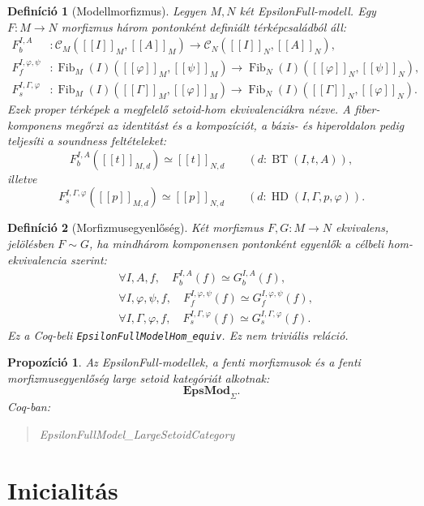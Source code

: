 \documentclass[11pt]{article}
\newtheorem{definition}{Definíció}
\newtheorem{proposition}{Propozíció}
\newenvironment{coqblock}
  {\begin{quote}\small\ttfamily\obeylines}
  {\end{quote}}
\newcommand{\EpsMod}{\mathbf{EpsMod}_{\Sigma}}
\newcommand{\BT}{\operatorname{BT}}
\newcommand{\HD}{\operatorname{HD}}
\newcommand{\Fib}{\operatorname{Fib}}
\newcommand{\sem}[1]{[\![#1]\!]}
\begin{document}
\begin{definition}[Modellmorfizmus]
Legyen $M,N$ két EpsilonFull-modell. Egy
$F:M\to N$ morfizmus három pontonként definiált térképcsaládból áll:
\[
\begin{aligned}
F_b^{I,A} &: \mathcal C_M(\sem I_M,\sem A_M)
          \longrightarrow
          \mathcal C_N(\sem I_N,\sem A_N),\\
F_f^{I,\varphi,\psi} &: \Fib_M(I)(\sem\varphi_M,\sem\psi_M)
          \longrightarrow
          \Fib_N(I)(\sem\varphi_N,\sem\psi_N),\\
F_s^{I,\Gamma,\varphi} &: \Fib_M(I)(\sem\Gamma_M,\sem\varphi_M)
          \longrightarrow
          \Fib_N(I)(\sem\Gamma_N,\sem\varphi_N).
\end{aligned}
\]
Ezek proper térképek a megfelelő setoid-hom ekvivalenciákra nézve. A
fiber-komponens megőrzi az identitást és a kompozíciót, a bázis- és
hiperoldalon pedig teljesíti a soundness feltételeket:
\[
  F_b^{I,A}(\sem{t}_{M,d})\simeq \sem{t}_{N,d}
  \qquad
  (d:\BT(I,t,A)),
\]
illetve
\[
  F_s^{I,\Gamma,\varphi}(\sem{p}_{M,d})
  \simeq
  \sem{p}_{N,d}
  \qquad
  (d:\HD(I,\Gamma,p,\varphi)).
\]
\end{definition}

\begin{definition}[Morfizmusegyenlőség]
Két morfizmus $F,G:M\to N$ ekvivalens, jelölésben $F\sim G$, ha
mindhárom komponensen pontonként egyenlők a célbeli hom-ekvivalencia
szerint:
\[
\begin{aligned}
&\forall I,A,f,\quad
  F_b^{I,A}(f)\simeq G_b^{I,A}(f),\\
&\forall I,\varphi,\psi,f,\quad
  F_f^{I,\varphi,\psi}(f)\simeq G_f^{I,\varphi,\psi}(f),\\
&\forall I,\Gamma,\varphi,f,\quad
  F_s^{I,\Gamma,\varphi}(f)\simeq G_s^{I,\Gamma,\varphi}(f).
\end{aligned}
\]
Ez a Coq-beli \texttt{EpsilonFullModelHom\_equiv}. Ez nem triviális
reláció.
\end{definition}

\begin{proposition}
Az EpsilonFull-modellek, a fenti morfizmusok és a fenti
morfizmusegyenlőség large setoid kategóriát alkotnak:
\[
  \EpsMod.
\]
Coq-ban:
\begin{coqblock}
EpsilonFullModel\_LargeSetoidCategory
\end{coqblock}
\end{proposition}

\section{Inicialitás}
\end{document}
